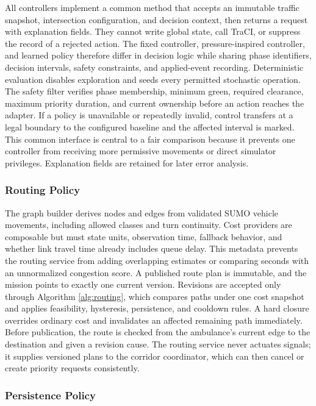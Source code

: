 All controllers implement a common method that accepts an immutable traffic snapshot, intersection configuration, and decision context, then returns a request with explanation fields. They cannot write global state, call TraCI, or suppress the record of a rejected action. The fixed controller, pressure-inspired controller, and learned policy therefore differ in decision logic while sharing phase identifiers, decision intervals, safety constraints, and applied-event recording. Deterministic evaluation disables exploration and seeds every permitted stochastic operation. The safety filter verifies phase membership, minimum green, required clearance, maximum priority duration, and current ownership before an action reaches the adapter. If a policy is unavailable or repeatedly invalid, control transfers at a legal boundary to the configured baseline and the affected interval is marked. This common interface is central to a fair comparison because it prevents one controller from receiving more permissive movements or direct simulator privileges. Explanation fields are retained for later error analysis.

\subsubsection{Routing Policy}

The graph builder derives nodes and edges from validated SUMO vehicle movements, including allowed classes and turn continuity. Cost providers are composable but must state units, observation time, fallback behavior, and whether link travel time already includes queue delay. This metadata prevents the routing service from adding overlapping estimates or comparing seconds with an unnormalized congestion score. A published route plan is immutable, and the mission points to exactly one current version. Revisions are accepted only through Algorithm \ref{alg:routing}, which compares paths under one cost snapshot and applies feasibility, hysteresis, persistence, and cooldown rules. A hard closure overrides ordinary cost and invalidates an affected remaining path immediately. Before publication, the route is checked from the ambulance's current edge to the destination and given a revision cause. The routing service never actuates signals; it supplies versioned plans to the corridor coordinator, which can then cancel or create priority requests consistently.

\subsubsection{Persistence Policy}

